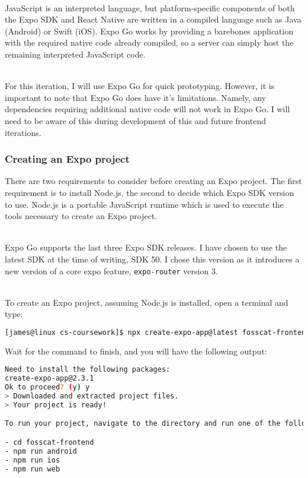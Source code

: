 \documentclass[../../main.tex]{subfiles}
\begin{document}
\noindent \\ JavaScript is an interpreted language, but platform-specific components of both
the Expo SDK and React Native are written in a compiled language such as Java (Android) or Swift (iOS).
Expo Go works by providing a barebones application with the required native code already compiled,
so a server can simply host the remaining interpreted JavaScript code.

\noindent \\ For this iteration, I will use Expo Go for quick prototyping.
However, it is important to note that Expo Go does have it's limitations.
Namely, any dependencies requiring additional native code will not work in Expo Go.
I will need to be aware of this during development of this and future frontend iterations.

\subsubsection{Creating an Expo project}

There are two requirements to consider before creating an Expo project.
The first requirement is to install Node.js, the second to decide which Expo SDK version
to use. Node.js is a portable JavaScript runtime which is used to execute the tools necessary
to create an Expo project.

\noindent \\ Expo Go supports the last three Expo SDK releases.
I have chosen to use the latest SDK at the time of writing, SDK 50.
I chose this version as it introduces a new version of a core expo feature,
\lstinline{expo-router} version 3.

\noindent \\ To create an Expo project, assuming Node.js is installed, open a terminal and type:

\begin{lstlisting}[language=bash]
    [james@linux cs-coursework]$ npx create-expo-app@latest fosscat-frontend --template tabs@50
\end{lstlisting}

\noindent Wait for the command to finish, and you will have the following output:

\begin{lstlisting}[language=bash]
Need to install the following packages:
create-expo-app@2.3.1
Ok to proceed? (y) y
> Downloaded and extracted project files.
> Your project is ready!

To run your project, navigate to the directory and run one of the following npm commands.

- cd fosscat-frontend
- npm run android
- npm run ios
- npm run web
\end{lstlisting}
\end{document}
